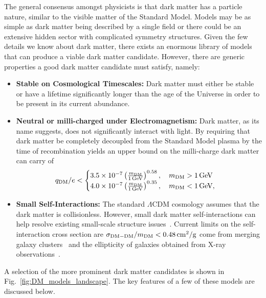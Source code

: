 The general consensus amongst physicists is that dark matter has a particle nature, similar to the visible matter of the Standard Model. Models may be as simple as dark matter being described by a single field or there could be an extensive hidden sector with complicated symmetry structures. Given the few details we know about dark matter, there exists an enormous library of models that can produce a viable dark matter candidate. However, there are generic properties a good dark matter candidate must satisfy, namely:
\begin{itemize}
    \item \textbf{Stable on Cosmological Timescales:} Dark matter must either be stable or have a lifetime significantly longer than the age of the Universe in order to be present in its current abundance. 
    
    \item \textbf{Neutral or milli-charged under Electromagnetism:} Dark matter, as its name suggests, does not significantly interact with light. By requiring that dark matter be completely decoupled from the Standard Model plasma by the time of recombination yields an upper bound on the milli-charge dark matter can carry of~\cite{McDermott:2010pa_TurningLightsHow} 
    \begin{equation}
        q_\mathrm{DM}/e < \begin{cases}
            3.5\times10^{-7} \left( \frac{m_\mathrm{DM}}{1{\rm \,GeV}}\right)^{0.58},\quad m_\mathrm{DM} > 1{\rm \,GeV}\\
            4.0\times 10^{-7}\left( \frac{m_\mathrm{DM}}{1{\rm \,GeV}}\right)^{0.35},\quad m_\mathrm{DM} <1{\rm \,GeV},
        \end{cases}
    \end{equation}
    
    \item \textbf{Small Self-Interactions:} The standard $\Lambda$CDM cosmology assumes that the dark matter is collisionless. However, small dark matter self-interactions can help resolve existing small-scale structure issues~\cite{Tulin:2017ara_feb_DarkMatterSelfinteractionsTulin:2017ara_feb_DarkMatterSelfinteractions, Spergel:1999mh_Observationalevidenceselfinteracting}. Current limits on the self-interaction cross section are $\sigma_{\mathrm{DM-DM}}/m_\mathrm{DM} < 0.48{\rm \,cm}^2/\mathrm{g}$ come from merging galaxy clusters~\cite{Randall:2008ppe_ConstraintsSelfInteractionCrossSection} and the ellipticity of galaxies obtained from X-ray observations~\cite{Buote:2002wd_ChandraEvidenceFlattened}.
\end{itemize}
A selection of the more prominent dark matter candidates is shown in Fig.~\ref{fig:DM_models_landscape}. The key features of a few of these models are discussed below.

